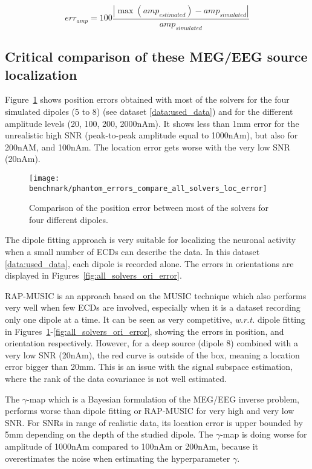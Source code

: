 \begin{equation}\label{eq:amp_err}
err_{amp} = 100 \frac{|\max(amp_{estimated}) - amp_{simulated}|}{amp_{simulated}}
\end{equation}

\subsection{Critical comparison of these MEG/EEG source localization}

Figure~\ref{fig:all_solvers_loc_error} shows position errors obtained with most of the solvers for the four simulated dipoles (5 to 8) (see dataset \ref{data:used_data}) and for the different amplitude levels (20, 100, 200, 2000nAm). It shows less than 1mm error for the unrealistic high \ac{SNR} (peak-to-peak amplitude equal to 1000nAm), but also for 200nAM, and 100nAm. The location error gets worse with the very low SNR (20nAm).

\begin{figure}[h!]
	\centering
    \texttt{[image: benchmark/phantom\_errors\_compare\_all\_solvers\_loc\_error]}
    \caption{Comparison of the position error between most of the solvers for four different dipoles. \label{fig:all_solvers_loc_error}}
\end{figure}

The dipole fitting approach is very suitable for localizing the neuronal activity when a small number of \ac{ECD}s can describe the data. In this dataset \ref{data:used_data}, each dipole is recorded alone. The errors in orientations are displayed in Figures~\ref{fig:all_solvers_ori_error}.

RAP-MUSIC is an approach based on the MUSIC technique which also performs very well when few ECDs are involved, especially when it is a dataset recording only one dipole at a time. It can be seen as very competitive, \textit{w.r.t.} dipole fitting in Figures~\ref{fig:all_solvers_loc_error}-\ref{fig:all_solvers_ori_error}, showing the errors in position, and orientation respectively. However, for a deep source (dipole 8) combined with a very low SNR (20nAm), the red curve is outside of the box, meaning a location error bigger than 20mm. This is an issue with the signal subspace estimation, where the rank of the data covariance is not well estimated.

The $\gamma$-map which is a Bayesian formulation of the MEG/EEG inverse problem,  performs worse than dipole fitting or RAP-MUSIC for very high and very low SNR. For SNRs in range of realistic data, its location error is upper bounded by 5mm depending on the depth of the studied dipole. The $\gamma$-map is doing worse for amplitude of 1000nAm compared to 100nAm or 200nAm, because it overestimates the noise when estimating the hyperparameter $\gamma$.

